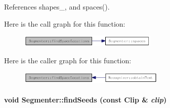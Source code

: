 References shapes\_\-, and spaces().

Here is the call graph for this function:\nopagebreak
\begin{figure}[H]
\begin{center}
\leavevmode
\includegraphics[width=187pt]{class_segmenter_7f4ab775f61d92c4d051f6ef4685cf6f_cgraph}
\end{center}
\end{figure}


Here is the caller graph for this function:\nopagebreak
\begin{figure}[H]
\begin{center}
\leavevmode
\includegraphics[width=197pt]{class_segmenter_7f4ab775f61d92c4d051f6ef4685cf6f_icgraph}
\end{center}
\end{figure}
\hypertarget{class_segmenter_bacab187b543a51c5322c01fc0a29ffb}{
\paragraph[findSeeds]{\setlength{\rightskip}{0pt plus 5cm}void Segmenter::findSeeds (const {\bf Clip} \& {\em clip})}\hfill}
\label{class_segmenter_bacab187b543a51c5322c01fc0a29ffb}


